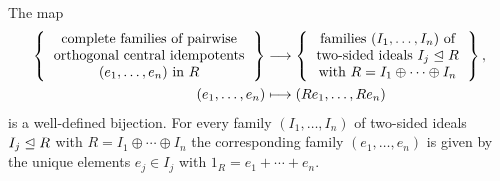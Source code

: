 \begin{theorem}
  \label{theorem: correspondence central idempotents and direct decompositions}
  The map
  \begin{align*}
    \left\{
      \begin{tabular}{c}
        complete families of pairwise \\
        orthogonal central idempotents  \\
        $(e_1, \dotsc, e_n)$ in $R$
      \end{tabular}
    \right\}
    &\longto
      \left\{
      \begin{tabular}{c}
        families $(I_1, \dotsc, I_n)$ of  \\
        two-sided ideals $I_j \idealleq R$ \\
        with $R = I_1 \oplus \dotsb \oplus I_n$
      \end{tabular}
      \right\},
    \\
                  (e_1, \dotsc, e_n)
    &\longmapsto  (R e_1, \dotsc, R e_n)
  \end{align*}
  is a well-defined bijection.
  For every family  $(I_1, \dotsc, I_n)$ of two-sided ideals $I_j \trianglelefteq R$ with $R = I_1 \oplus \dotsb \oplus I_n$ the corresponding family $(e_1, \dotsc, e_n)$ is given by the unique elements $e_j \in I_j$ with $1_R = e_1 + \dotsb + e_n$.
\end{theorem}






